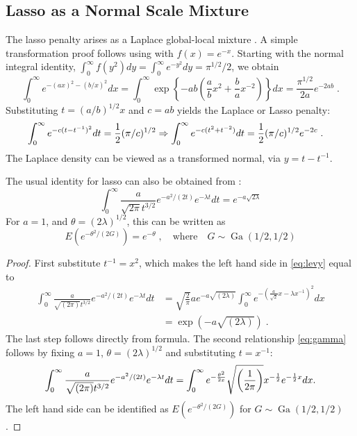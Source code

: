 \documentclass[lineno]{biometrika}
\begin{document}
\subsection{Lasso as a Normal Scale Mixture}
The lasso penalty arises as a Laplace global-local mixture
\citep{andrews_scale_1974}.  A simple transformation proof follows using \CS{}
with $f(x) = e^{-x}$.  Starting with the normal integral identity, 
$\int_{0}^{\infty} f(y^2) dy = \int_0^\infty e^{-y^2} d y = \pi^{1/2}/2 $, we
obtain
$$
\int_0^\infty e^{-(a x)^2 - (b/x)^2} d x = \int_0^{\infty} 
\exp\left\{-a b \left(\frac{a}{b} x^2 + \frac{b}{a} x^{-2} \right)\right\} dx 
= \frac{\pi^{1/2}}{2a} e^{- 2 ab}
\;.
$$
Substituting $t = (a/b)^{1/2} x$ and $c = ab$ yields the Laplace or Lasso penalty:  
\begin{align*}
  \int_0^\infty e^{- c (t - t^{-1})^2} d t & = \frac{1}{2} (\pi/c)^{1/2} 
  \Rightarrow \int_0^\infty e^{- c (t^2 + t^{-2})} d t 
  = \frac{1}{2} (\pi/c)^{1/2} e^{-2c}
  \;. 
\end{align*}
The Laplace density can be viewed as a transformed normal, via $y = t - t^{-1}$.

\begin{remark}
The usual identity for lasso can also be obtained from \citet{levy1940certains}:
\begin{equation}
  \int_{0}^{\infty} \frac{a}{\sqrt{2 \pi} t^{3/2}} e^{-a^2/(2t)} e^{-\lambda t} dt 
  = e^{-a\sqrt{2 \lambda}} 
  \label{eq:levy}
\end{equation}
For $a = 1$, and $\theta = (2\lambda)^{1/2}$, this can be written as 
\begin{equation}
  E\left(e^{-\theta^2/(2 G) } \right) = e^{-\theta}
  \;, 
  \quad\text{where}\quad 
  G \sim \operatorname{Ga}(1/2, 1/2) 
  \label{eq:gamma}
\end{equation}
\end{remark}

\begin{proof}
First substitute $t^{-1} = x^2$, which makes the left hand side in
\eqref{eq:levy} equal to 
\begin{align*}
  \int_{0}^{\infty} \frac{a}{\sqrt{(2\pi)} t^{3/2}} e^{-a^2/(2 t)} e^{-\lambda t} dt 
  & = \sqrt{\frac{2}{\pi}} a e^{-a \sqrt{(2\lambda)}} 
  \int_0^{\infty} e^{-\left(\frac{a}{\sqrt{2}} x - \lambda x^{-1}\right)^2} dx 
  \\
  &= \exp(-a\sqrt{(2\lambda)})
  \;.
\end{align*}
The last step follows directly from \CS{} formula.  The second relationship
\eqref{eq:gamma} follows by fixing $a = 1$, $\theta = (2\lambda)^{1/2}$ and
substituting $t = x^{-1}$: 
$$
\int_{0}^{\infty} \frac{a}{\sqrt{(2\pi)} t^{3/2}} e^{-a^2/(2 t)} e^{-\lambda t} dt 
= \int_{0}^{\infty} e^{-\frac{\theta^2}{2x}} \sqrt{\left(\frac{1}{2\pi}\right)} 
x^{-\frac{1}{2}} e^{-\frac{1}{2} x} dx.
$$
The left hand side can be identified as 
$E\left(e^{-\theta^2 / (2 G) } \right)$ for 
$G \sim \operatorname{Ga}(1/2, 1/2)$. %
\end{proof}
\end{document}
